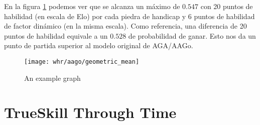 \documentclass[a4paper,10pt]{report}
\begin{document}
En la figura \ref{fig:whr-evidence} podemos ver que se alcanza un máximo de $0.547$ con 20 puntos de habilidad (en escala de Elo) por cada piedra de handicap y 6 puntos de habilidad de factor dinámico (en la misma escala).
Como referencia, una diferencia de 20 puntos de habilidad equivale a un $0.528$ de probabilidad de ganar.
Esto nos da un punto de partida superior al modelo original de AGA/AAGo.

\begin{figure}
	\centering
	\texttt{[image: whr/aago/geometric\_mean]}
	\caption{An example graph}
	\label{fig:whr-evidence}
\end{figure}


\section*{TrueSkill Through Time}


\end{document}
